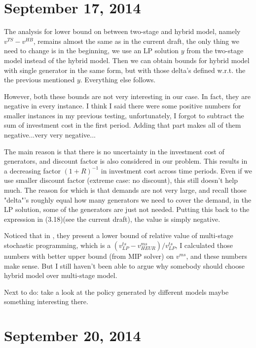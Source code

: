 \documentclass[10pt]{article}
\theoremstyle{plain}
\theoremstyle{definition}
\theoremstyle{remark}
\begin{document}
\section*{September 17, 2014}
The analysis for lower bound on between two-stage and hybrid model, namely $v^{TS} - v^{HB}$,
remains almost the same as in the current draft, the only thing we need to change is in the beginning,
we use an LP solution $y$ from the two-stage model instead of the hybrid model.
Then we can obtain bounds for hybrid model with single generator in the same form,
but with those delta's defined w.r.t. the the previous mentioned $y$. Everything else follows.

However, both these bounds are not very interesting in our case.
In fact, they are negative in every instance. I think I said there were some
positive numbers for smaller instances in my previous testing,
unfortunately, I forgot to subtract the sum of investment cost in the first period.
Adding that part makes all of them negative...very very negative...

The main reason is that there is no uncertainty in the investment cost of generators,
and discount factor is also considered in our problem.
This results in a decreasing factor $(1+R)^{-1}$ in investment cost across time periods.
Even if we use smaller discount factor (extreme case: no discount), this still doesn't help much.
The reason for which is that demands are not very large, and recall those "delta"'s roughly equal
how many generators we need to cover the demand, in the LP solution, some of the generators are
just not needed. Putting this back to the expression in (3.18)(see the current draft),
the value is simply negative.

Noticed that in \cite{HA2009}, they present a lower bound of relative value of multi-stage stochastic programming,
which is a $(v^{ts}_{LP} - v^{ms}_{HEUR}) / v^{ts}_{LP}$, I calculated those numbers with
better upper bound (from MIP solver) on $v^{ms}$, and these numbers make sense.
But I still haven't been able to argue why somebody should choose hybrid model over multi-stage model.

Next to do: take a look at the policy generated by different models maybe something interesting there.

\section*{September 20, 2014}
\end{document}
